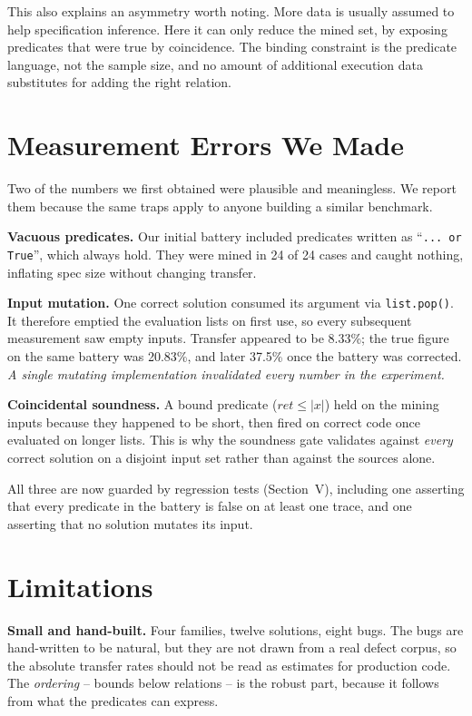 \documentclass[conference]{IEEEtran}
\begin{document}
This also explains an asymmetry worth noting. More data is usually assumed to help
specification inference. Here it can only reduce the mined set, by exposing predicates that
were true by coincidence. The binding constraint is the predicate language, not the sample
size, and no amount of additional execution data substitutes for adding the right relation.

\section{Measurement Errors We Made}

Two of the numbers we first obtained were plausible and meaningless. We report them because
the same traps apply to anyone building a similar benchmark.

\textbf{Vacuous predicates.} Our initial battery included predicates written as
``\texttt{... or True}'', which always hold. They were mined in 24 of 24 cases and caught
nothing, inflating spec size without changing transfer.

\textbf{Input mutation.} One correct solution consumed its argument via \texttt{list.pop()}.
It therefore emptied the evaluation lists on first use, so every subsequent measurement saw
empty inputs. Transfer appeared to be 8.33\%; the true figure on the same battery was
20.83\%, and later 37.5\% once the battery was corrected. \emph{A single mutating
implementation invalidated every number in the experiment.}

\textbf{Coincidental soundness.} A bound predicate ($\mathit{ret} \le |x|$) held on the
mining inputs because they happened to be short, then fired on correct code once evaluated
on longer lists. This is why the soundness gate validates against \emph{every} correct
solution on a disjoint input set rather than against the sources alone.

All three are now guarded by regression tests (Section~V), including one asserting that
every predicate in the battery is false on at least one trace, and one asserting that no
solution mutates its input.

\section{Limitations}

\textbf{Small and hand-built.} Four families, twelve solutions, eight bugs. The bugs are
hand-written to be natural, but they are not drawn from a real defect corpus, so the
absolute transfer rates should not be read as estimates for production code. The
\emph{ordering} -- bounds below relations -- is the robust part, because it follows from
what the predicates can express.
\end{document}
